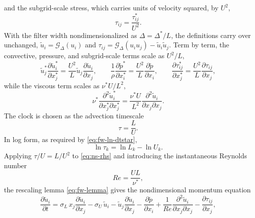 \documentclass{article}
\begin{document}
and the subgrid-scale stress, which carries units of velocity squared, by
$U^2$,
\begin{equation}\label{eq:ns-sgs-nondim}
  \tau_{ij} = \frac{\tau_{ij}^*}{U^2}.
\end{equation}
With the filter width nondimensionalized as $\Delta = \Delta^*/L$, the
definitions carry over unchanged, $\tilde u_i = \mathcal{G}_\Delta(u_i)$ and
$\tau_{ij} = \mathcal{G}_\Delta(u_i u_j) - \tilde u_i \tilde u_j$.
Term by term, the convective, pressure, and subgrid-scale terms scale as
$U^2/L$,
\begin{equation}\label{eq:ns-convection}
  \tilde u_j^* \frac{\partial \tilde u_i^*}{\partial x_j^*} = \frac{U^2}{L} \tilde u_j \frac{\partial \tilde u_i}{\partial x_j},
  \qquad
  \frac{1}{\rho}\frac{\partial \tilde p^*}{\partial x_i^*} = \frac{U^2}{L} \frac{\partial \tilde p}{\partial x_i},
  \qquad
  \frac{\partial \tau_{ij}^*}{\partial x_j^*} = \frac{U^2}{L} \frac{\partial \tau_{ij}}{\partial x_j},
\end{equation}
while the viscous term scales as $\nu^* U / L^2$,
\begin{equation}\label{eq:ns-viscous}
  \nu^* \frac{\partial^2 \tilde u_i^*}{\partial x_j^* \partial x_j^*} = \frac{\nu^* U}{L^2}\frac{\partial^2 \tilde u_i}{\partial x_j \partial x_j}.
\end{equation}
The clock is chosen as the advection timescale
\begin{equation}\label{eq:ns-clock}
  \tau = \frac{L}{U}.
\end{equation}
In log form, as required by \eqref{eq:fw-ln-dtstar},
\begin{equation}\label{eq:ns-ln-clock}
  \ln \tau_k = \ln L_k - \ln U_k .
\end{equation}
Applying $\tau / U = L/U^2$ to \eqref{eq:ns-rhs} and introducing the
instantaneous Reynolds number
\begin{equation}\label{eq:ns-reynolds}
  Re = \frac{U L}{\nu^*},
\end{equation}
the rescaling lemma \eqref{eq:fw-lemma} gives the nondimensional momentum
equation
\begin{equation}\label{eq:ns-nondim-momentum-base}
  \frac{\partial \tilde u_i}{\partial t}
  = \sigma_L\, x_j \frac{\partial \tilde u_i}{\partial x_j}
  - \sigma_U\, \tilde u_i
  - \tilde u_j \frac{\partial \tilde u_i}{\partial x_j}
  - \frac{\partial \tilde p}{\partial x_i}
  + \frac{1}{Re} \frac{\partial^2 \tilde u_i}{\partial x_j \partial x_j}
  - \frac{\partial \tau_{ij}}{\partial x_j},
\end{equation}
\end{document}
